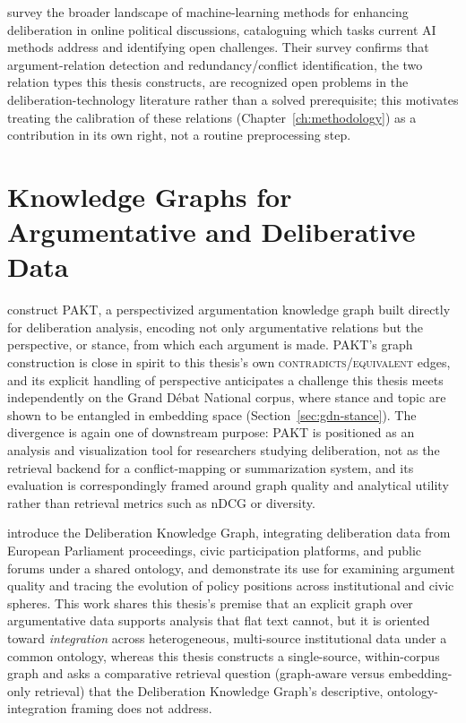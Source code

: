 \textcite{behrendt2025survey} survey the broader landscape of machine-learning methods for
enhancing deliberation in online political discussions, cataloguing which tasks current AI
methods address and identifying open challenges. Their survey confirms that argument-relation
detection and redundancy/conflict identification, the two relation types this thesis constructs,
are recognized open problems in the deliberation-technology literature rather than a solved
prerequisite; this motivates treating the calibration of these relations (Chapter~\ref{ch:methodology})
as a contribution in its own right, not a routine preprocessing step.

\section{Knowledge Graphs for Argumentative and Deliberative Data}
\label{sec:rw-kg-deliberation}

\textcite{plenz2024pakt} construct PAKT, a perspectivized argumentation knowledge graph built
directly for deliberation analysis, encoding not only argumentative relations but the
perspective, or stance, from which each argument is made. PAKT's graph construction is close in
spirit to this thesis's own \textsc{contradicts}/\textsc{equivalent} edges, and its explicit
handling of perspective anticipates a challenge this thesis meets independently on the Grand
D\'ebat National corpus, where stance and topic are shown to be entangled in embedding space
(Section~\ref{sec:gdn-stance}). The divergence is again one of downstream purpose: PAKT is
positioned as an analysis and visualization tool for researchers studying deliberation, not as
the retrieval backend for a conflict-mapping or summarization system, and its evaluation is
correspondingly framed around graph quality and analytical utility rather than retrieval metrics
such as nDCG or diversity.

\textcite{vagnoni2025delibkg} introduce the Deliberation Knowledge Graph, integrating deliberation
data from European Parliament proceedings, civic participation platforms, and public forums under
a shared ontology, and demonstrate its use for examining argument quality and tracing the
evolution of policy positions across institutional and civic spheres. This work shares this
thesis's premise that an explicit graph over argumentative data supports analysis that flat text
cannot, but it is oriented toward \emph{integration} across heterogeneous, multi-source
institutional data under a common ontology, whereas this thesis constructs a single-source,
within-corpus graph and asks a comparative retrieval question (graph-aware versus
embedding-only retrieval) that the Deliberation Knowledge Graph's descriptive, ontology-integration
framing does not address.

